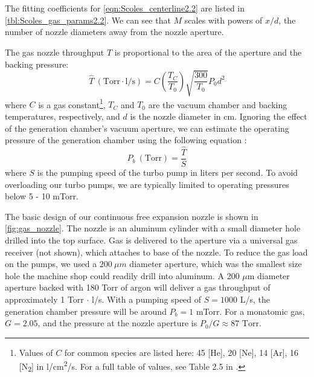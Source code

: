 The fitting coefficients for \cref{eqn:Scoles_centerline2.2} are listed in \cref{tbl:Scoles_gas_params2.2}. We can see that $M$ scales with powers of $x/d$, the number of nozzle diameters away from the nozzle aperture.

The gas nozzle throughput $\hat{T}$ is proportional to the area of the aperture and the backing pressure:
\begin{equation}
\hat{T} \ (\text{Torr} \cdot \text{l}/\text{s}) = C \left(\frac{T_C}{T_0} \right)\sqrt{\frac{300}{T_0}} P_0 d^2
\label{eqn:nozzle_thruput}
\end{equation}
where $C$ is a gas constant\footnote{Values of $C$ for common species are listed here: 45 [He], 20 [Ne], 14 [Ar], 16 [N\textsubscript{2}] in l/cm\textsuperscript{2}/s. For a full table of values, see Table 2.5 in \cite{millerFreeJetSources1988}.}, $T_C$ and $T_0$ are the vacuum chamber and backing temperatures, respectively, and $d$ is the nozzle diameter in cm. Ignoring the effect of the generation chamber's vacuum aperture, we can estimate the operating pressure of the generation chamber using the following equation \cite{hablanianHighvacuumTechnologyPractical1997}:
\begin{equation}
P_b \ (\text{Torr}) = \frac{\hat{T}}{S}
\end{equation}
where $S$ is the pumping speed of the turbo pump in liters per second. To avoid overloading our turbo pumps, we are typically limited to operating pressures below 5 - 10 mTorr.

The basic design of our continuous free expansion nozzle is shown in \cref{fig:gas_nozzle}. The nozzle is an aluminum cylinder with a small diameter hole drilled into the top surface. Gas is delivered to the aperture via a universal gas receiver (not shown), which attaches to base of the nozzle. To reduce the gas load on the pumps, we used a $200 \ \mu m$ diameter aperture, which was the smallest size hole the machine shop could readily drill into aluminum. A 200 $\mu$m diameter aperture backed with 180 Torr of argon will deliver a gas throughput of approximately {1 Torr $\cdot$ l/s}. With a pumping speed of $S = 1000$ L/s, the generation chamber pressure will be around $P_b = 1$ mTorr. For a monatomic gas, $G = 2.05$, and the pressure at the nozzle aperture is $P_0/G \approx 87 \textrm{ Torr}$.

